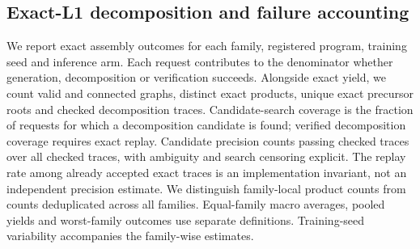 \subsection{Exact-L1 decomposition and failure accounting}
We report exact assembly outcomes for each family, registered program, training seed and inference
arm. Each request contributes to the denominator whether generation, decomposition or verification
succeeds. Alongside exact yield, we count valid and connected graphs, distinct exact products,
unique exact precursor roots and checked decomposition traces.
Candidate-search coverage is the fraction of requests for which a decomposition candidate is found;
verified decomposition coverage requires exact replay. Candidate precision counts passing checked
traces over all checked traces, with ambiguity and search censoring explicit. The replay rate among
already accepted exact traces is an implementation invariant, not an independent precision estimate.
We distinguish family-local product counts from counts deduplicated across all families. Equal-family
macro averages, pooled yields and worst-family outcomes use separate definitions. Training-seed
variability accompanies the family-wise estimates.

